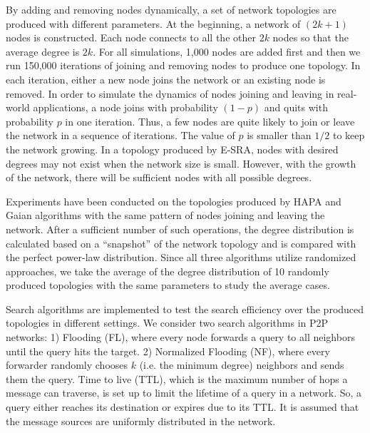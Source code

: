 By adding and removing nodes dynamically, a set of network topologies are produced with different parameters. At the beginning, a network of $(2k+1)$ nodes is constructed. Each node connects to all the other $2k$ nodes so that the average degree is $2k$. For all simulations, 1,000 nodes are added first and then we run 150,000 iterations of joining and removing nodes to produce one topology. In each iteration, either a new node joins the network or an existing node is removed. In order to simulate the dynamics of nodes joining and leaving in real-world applications, a node joins with probability $(1-p)$ and quits with probability $p$ in one iteration. Thus, a few nodes are quite likely to join or leave the network in a sequence of iterations. The value of $p$ is smaller than $1/2$ to keep the network growing. In a topology produced by E-SRA, nodes with desired degrees may not exist when the network size is small. However, with the growth of the network, there will be sufficient nodes with all possible degrees.

Experiments have been conducted on the topologies produced by HAPA and Gaian algorithms with the same pattern of nodes joining and leaving the network. After a sufficient number of such operations, the degree distribution is calculated based on a ``snapshot'' of the network topology and is compared with the perfect power-law distribution. Since all three algorithms utilize randomized approaches, we take the average of the degree distribution of 10 randomly produced topologies with the same parameters to study the average cases. 

Search algorithms are implemented to test the search efficiency over the produced topologies in different settings. We consider two search algorithms in P2P networks: 1) Flooding (FL), where every node forwards a query to all neighbors until the query hits the target. 2) Normalized Flooding (NF), where every forwarder randomly chooses $k$ (i.e. the minimum degree) neighbors and sends them the query. Time to live (TTL), which is the maximum number of hops a message can traverse, is set up to limit the lifetime of a query in a network. So, a query either reaches its destination or expires due to its TTL. It is assumed that the message sources are uniformly distributed in the network.





